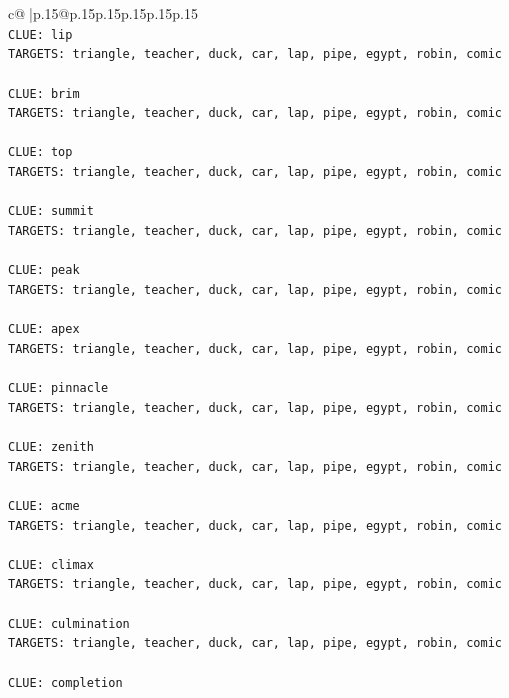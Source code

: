 \documentclass{article}
\begin{document}
{\begin{supertabular}{c@{$\;$}|p{.15\linewidth}@{}p{.15\linewidth}p{.15\linewidth}p{.15\linewidth}p{.15\linewidth}p{.15\linewidth}}
{{{\\ 
\texttt{CLUE: lip} \\
\texttt{TARGETS: triangle, teacher, duck, car, lap, pipe, egypt, robin, comic} \\
\\ 
\texttt{CLUE: brim} \\
\texttt{TARGETS: triangle, teacher, duck, car, lap, pipe, egypt, robin, comic} \\
\\ 
\texttt{CLUE: top} \\
\texttt{TARGETS: triangle, teacher, duck, car, lap, pipe, egypt, robin, comic} \\
\\ 
\texttt{CLUE: summit} \\
\texttt{TARGETS: triangle, teacher, duck, car, lap, pipe, egypt, robin, comic} \\
\\ 
\texttt{CLUE: peak} \\
\texttt{TARGETS: triangle, teacher, duck, car, lap, pipe, egypt, robin, comic} \\
\\ 
\texttt{CLUE: apex} \\
\texttt{TARGETS: triangle, teacher, duck, car, lap, pipe, egypt, robin, comic} \\
\\ 
\texttt{CLUE: pinnacle} \\
\texttt{TARGETS: triangle, teacher, duck, car, lap, pipe, egypt, robin, comic} \\
\\ 
\texttt{CLUE: zenith} \\
\texttt{TARGETS: triangle, teacher, duck, car, lap, pipe, egypt, robin, comic} \\
\\ 
\texttt{CLUE: acme} \\
\texttt{TARGETS: triangle, teacher, duck, car, lap, pipe, egypt, robin, comic} \\
\\ 
\texttt{CLUE: climax} \\
\texttt{TARGETS: triangle, teacher, duck, car, lap, pipe, egypt, robin, comic} \\
\\ 
\texttt{CLUE: culmination} \\
\texttt{TARGETS: triangle, teacher, duck, car, lap, pipe, egypt, robin, comic} \\
\\ 
\texttt{CLUE: completion} \\
}}}
\end{supertabular}}
\end{document}
